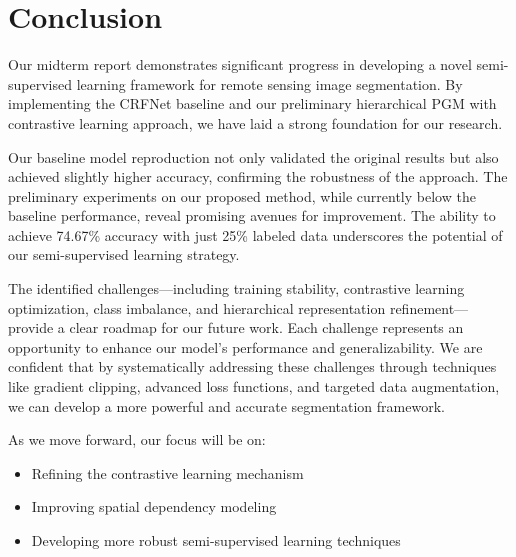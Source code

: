 \documentclass[conference]{IEEEtran}
\begin{document}
\section*{Conclusion}

Our midterm report demonstrates significant progress in developing a novel semi-supervised learning framework for remote sensing image segmentation. By implementing the CRFNet baseline and our preliminary hierarchical PGM with contrastive learning approach, we have laid a strong foundation for our research.

Our baseline model reproduction not only validated the original results but also achieved slightly higher accuracy, confirming the robustness of the approach. The preliminary experiments on our proposed method, while currently below the baseline performance, reveal promising avenues for improvement. The ability to achieve 74.67\% accuracy with just 25\% labeled data underscores the potential of our semi-supervised learning strategy.

The identified challenges---including training stability, contrastive learning optimization, class imbalance, and hierarchical representation refinement---provide a clear roadmap for our future work. Each challenge represents an opportunity to enhance our model's performance and generalizability. We are confident that by systematically addressing these challenges through techniques like gradient clipping, advanced loss functions, and targeted data augmentation, we can develop a more powerful and accurate segmentation framework.

As we move forward, our focus will be on:
\begin{itemize}
    \item Refining the contrastive learning mechanism
    \item Improving spatial dependency modeling
    \item Developing more robust semi-supervised learning techniques
\end{itemize}   





\end{document}
